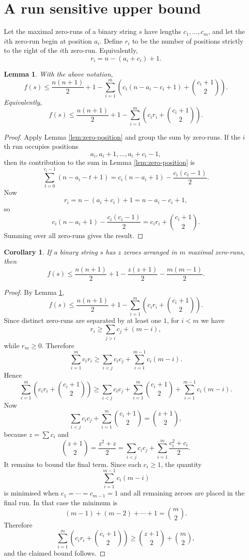 \documentclass[11pt]{article}
\newtheorem{lemma}[theorem]{Lemma}
\newtheorem{corollary}[theorem]{Corollary}
\begin{document}
\section{A run sensitive upper bound}

Let the maximal zero-runs of a binary string $s$ have lengths $c_1,\dots,c_m$, and let the $i$th zero-run begin at position $a_i$.  Define $r_i$ to be the number of positions strictly to the right of the $i$th zero-run.  Equivalently,
\[
r_i=n-(a_i+c_i)+1.
\]

\begin{lemma}\label{lem:run-sensitive}
With the above notation,
\[
f(s)\le \frac{n(n+1)}2+1-\sum_{i=1}^m\left(c_i(n-a_i-c_i+1)+\binom{c_i+1}{2}\right).
\]
Equivalently,
\[
f(s)\le \frac{n(n+1)}2+1-\sum_{i=1}^m\left(c_i r_i+\binom{c_i+1}{2}\right).
\]
\end{lemma}

\begin{proof}
Apply Lemma \ref{lem:zero-position} and group the sum by zero-runs.  If the $i$th run occupies positions
\[
a_i,a_i+1,\dots,a_i+c_i-1,
\]
then its contribution to the sum in Lemma \ref{lem:zero-position} is
\[
\sum_{t=0}^{c_i-1}(n-a_i-t+1)
=
c_i(n-a_i+1)-\frac{c_i(c_i-1)}{2}.
\]
Now
\[
r_i=n-(a_i+c_i)+1=n-a_i-c_i+1,
\]
so
\[
c_i(n-a_i+1)-\frac{c_i(c_i-1)}{2}
=
c_i r_i+\binom{c_i+1}{2}.
\]
Summing over all zero-runs gives the result.
\end{proof}

\begin{corollary}\label{cor:fragmentation}
If a binary string $s$ has $z$ zeroes arranged in $m$ maximal zero-runs, then
\[
f(s)\le \frac{n(n+1)}2+1-\frac{z(z+1)}2-\frac{m(m-1)}2.
\]
\end{corollary}

\begin{proof}
By Lemma \ref{lem:run-sensitive},
\[
f(s)\le \frac{n(n+1)}2+1-\sum_{i=1}^m\left(c_i r_i+\binom{c_i+1}{2}\right).
\]
Since distinct zero-runs are separated by at least one $1$, for $i<m$ we have
\[
r_i\ge \sum_{j>i} c_j +(m-i),
\]
while $r_m\ge 0$.  Therefore
\[
\sum_{i=1}^m c_i r_i
\ge
\sum_{i<j} c_i c_j+\sum_{i=1}^{m-1} c_i(m-i).
\]
Hence
\[
\sum_{i=1}^m\left(c_i r_i+\binom{c_i+1}{2}\right)
\ge
\sum_{i<j} c_i c_j+\sum_{i=1}^m\binom{c_i+1}{2}+\sum_{i=1}^{m-1} c_i(m-i).
\]
Now
\[
\sum_{i<j} c_i c_j+\sum_{i=1}^m\binom{c_i+1}{2}=\binom{z+1}{2},
\]
because $z=\sum c_i$ and
\[
\binom{z+1}{2}=\frac{z^2+z}{2}=\sum_{i<j} c_i c_j+\sum_{i=1}^m \frac{c_i^2+c_i}{2}.
\]
It remains to bound the final term.  Since each $c_i\ge 1$, the quantity
\[
\sum_{i=1}^{m-1} c_i(m-i)
\]
is minimised when $c_1=\cdots=c_{m-1}=1$ and all remaining zeroes are placed in the final run.  In that case the minimum is
\[
(m-1)+(m-2)+\cdots+1=\binom m2.
\]
Therefore
\[
\sum_{i=1}^m\left(c_i r_i+\binom{c_i+1}{2}\right)
\ge
\binom{z+1}{2}+\binom m2,
\]
and the claimed bound follows.
\end{proof}
\end{document}
